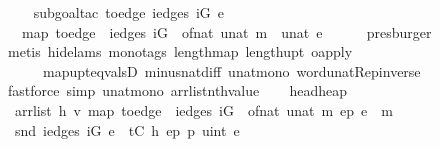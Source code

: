 \begin{isabellebody}
\ \ \ \isamarkupfalse%
\ {\isacharparenleft}subgoal{\isacharunderscore}tac\ {\isachardoublequoteopen}to{\isacharunderscore}edge\ {\isacharparenleft}{\isacharparenleft}iedges\ iG{\isacharparenright}\ e{\isacharparenright}\ {\isacharequal}\ \isanewline
\ \ \ {\isacharparenleft}map\ {\isacharparenleft}to{\isacharunderscore}edge\ {\isasymcirc}\ {\isacharparenleft}iedges\ iG\ {\isasymcirc}\ of{\isacharunderscore}nat{\isacharparenright}{\isacharparenright}\ {\isacharbrackleft}{}{\isachardot}{\isachardot}{\isacharless}unat\ m{\isacharbrackright}{\isacharparenright}\ {\isacharbang}\ unat\ e{\isachardoublequoteclose}{\isacharparenright}\isanewline
\ \ \ \ \isamarkupfalse%
\ presburger\ \isanewline
\ \ \ \isamarkupfalse%
\ {\isacharparenleft}metis\ {\isacharparenleft}hide{\isacharunderscore}lams{\isacharcomma}\ mono{\isacharunderscore}tags{\isacharparenright}\ length{\isacharunderscore}map\ length{\isacharunderscore}upt\ o{\isacharunderscore}apply\isanewline
\ \ \ \ \ \ map{\isacharunderscore}upt{\isacharunderscore}eq{\isacharunderscore}vals{\isacharunderscore}D\ minus{\isacharunderscore}nat{\isachardot}diff{\isacharunderscore}{}\ unat{\isacharunderscore}mono\ word{\isacharunderscore}unat{\isachardot}Rep{\isacharunderscore}inverse{\isacharparenright}\isanewline
\ \ \isamarkupfalse%
\ {\isacharparenleft}fastforce\ simp{\isacharcolon}\ unat{\isacharunderscore}mono\ arrlist{\isacharunderscore}nth{\isacharunderscore}value{\isacharparenright}\isanewline
\ \ \isamarkupfalse%
%
\endisatagproof
{\isafoldproof}%
%
\isadelimproof
\isanewline
%
\endisadelimproof
\isanewline
{}\isamarkupfalse%
\ head{\isacharunderscore}heap{\isacharcolon}\isanewline
\ \ {\isachardoublequoteopen}{\isasymlbrakk}arrlist\ h\ v\ {\isacharparenleft}map\ {\isacharparenleft}to{\isacharunderscore}edge\ {\isasymcirc}\ {\isacharparenleft}iedges\ iG\ {\isasymcirc}\ of{\isacharunderscore}nat{\isacharparenright}{\isacharparenright}\ {\isacharbrackleft}{}{\isachardot}{\isachardot}{\isacharless}unat\ m{\isacharbrackright}{\isacharparenright}\ ep{\isacharsemicolon}\ e\ {\isacharless}\ m{\isasymrbrakk}\ {\isasymLongrightarrow}\isanewline
\ \ snd\ {\isacharparenleft}{\isacharparenleft}iedges\ iG{\isacharparenright}\ e{\isacharparenright}\ {\isacharequal}\ t{\isacharunderscore}C\ {\isacharparenleft}h\ {\isacharparenleft}ep\ {\isacharplus}\isactrlsub p\ {\isacharparenleft}uint\ e{\isacharparenright}{\isacharparenright}{\isacharparenright}{\isachardoublequoteclose}\ \isanewline

\end{isabellebody}
